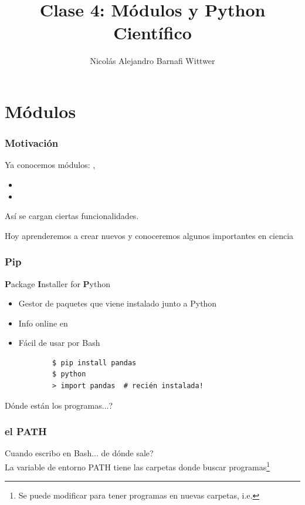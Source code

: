 \documentclass[14pt,aspectratio=169,xcolor=dvipsnames]{beamer}
\title[short title]{Clase 4: Módulos y Python Científico}
\subtitle{}
\author[NA Barnafi] {Nicolás Alejandro Barnafi Wittwer}
\institute[UC|CMM] 
{
    Pontificia Universidad Católica de Chile \\
    Centro de Modelamiento Matemático
}
\date{}
\begin{document}
\begin{frame}
    \maketitle
\end{frame}
\section{Módulos}
\begin{frame}[fragile]\frametitle{Motivación}
    Ya conocemos módulos: , 
    \begin{itemize}
        \item {}
        \item {}
    \end{itemize}
    Así se cargan ciertas funcionalidades. 

    \pause Hoy aprenderemos a crear nuevos y conoceremos algunos importantes en ciencia
\end{frame}
\begin{frame}[fragile]\frametitle{Pip}
    \textbf{P}ackage \textbf{I}nstaller for \textbf{P}ython
    
    \begin{itemize}
        \item Gestor de paquetes que viene instalado junto a Python
        \item Info online en 
        \item Fácil de usar por Bash
            \begin{verbatim}
        $ pip install pandas
        $ python
        > import pandas  # recién instalada!
            \end{verbatim}
    \end{itemize}

    \pause Dónde están los programas...?
\end{frame}
\begin{frame}\frametitle{el PATH}
    Cuando escribo  en Bash... de dónde sale? \\

    \vspace{0.5cm}
    La variable de entorno PATH tiene las carpetas donde buscar programas\footnote{Se puede modificar para tener programas en nuevas carpetas, i.e. }

    \pause {}
\end{frame}
\end{document}

